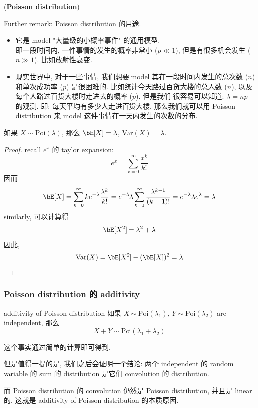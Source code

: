 \begin{example}{(\textbf{Poisson distribution})}
\begin{remark}

Further remark: Poisson distribution 的用途.
\begin{itemize}
    \item 它是 model "大量级的小概率事件" 的通用模型.\\ 
    即一段时间内, 一件事情的发生的概率非常小 (\(p \ll 1\)), 
    但是有很多机会发生 (\(n \gg 1\)). 比如放射性衰变.
    \item 现实世界中, 对于一些事情, 我们想要 model 其在一段时间内发生的总次数 (\(n\)) 和单次成功率 (\(p\)) 
    是很困难的. 比如统计今天路过百货大楼的总人数 (\(n\)), 以及每个人路过百货大楼时走进去的概率 (\(p\)). 但是我们
    很容易可以知道: \(\lambda = np\) 的观测. 即: 每天平均有多少人走进百货大楼. 那么我们就可以用 Poisson distribution 来 model 这件事情在一天内发生的次数的分布.\\
\end{itemize}
\end{remark}
\end{example}

\begin{proposition}
    如果 \(X \sim \text{Poi}(\lambda)\), 那么 \(\bE[X] = \lambda\), \(\text{Var}(X) = \lambda\).
\end{proposition}
\begin{proof}
recall \(e^x\) 的 taylor expansion: \[
e^x = \sum_{k=0}^\infty \frac{x^k}{k!}
\]
因而
    \[
    \bE[X] = \sum_{k=0}^\infty k e^{-\lambda} \frac{\lambda^k}{k!} = 
    e^{-\lambda} \lambda \sum_{k=1}^\infty \frac{\lambda^{k-1}}{(k-1)!} =
    e^{-\lambda} \lambda e^{\lambda} = \lambda
    \]
similarly, 可以计算得 \[
\bE[X^2] = \lambda^2 + \lambda
\]
因此, \[
\text{Var}(X) = \bE[X^2] - (\bE[X])^2 = \lambda
\]
\end{proof}


\subsubsection{Poisson distribution 的 additivity}
\begin{theorem}{additivity of Poisson distribution}
    如果 \(X \sim \text{Poi}(\lambda_1)\), \(Y \sim \text{Poi}(\lambda_2)\) are independent, 那么
    \[
    X + Y \sim \text{Poi}(\lambda_1 + \lambda_2)
    \]
\end{theorem}
\begin{remark}
这个事实通过简单的计算即可得到. 

但是值得一提的是, 我们之后会证明一个结论: 两个 independent 的 random variable 
的 sum 的 distribution 是它们 convolution 的 distribution.

而 Poisson distribution 的 convolution 仍然是 Poisson distribution, 
并且是 linear 的. 这就是 additivity of Poisson distribution 的本质原因.
\end{remark}



